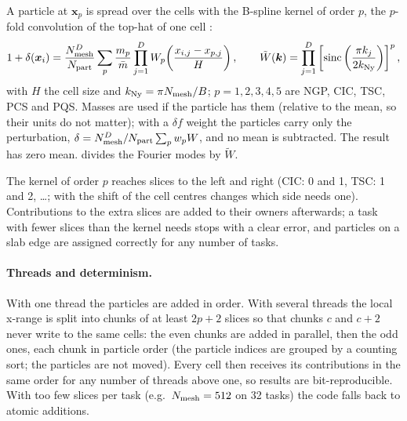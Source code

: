 A particle at $\bm x_p$ is spread over the cells with the B-spline kernel of order $p$, the $p$-fold convolution of the top-hat
of one cell \cite{HockneyEastwood1988}:
\begin{equation}
1+\delta(\bm x_i)=\frac{N_{\rm mesh}^D}{N_{\rm part}}\sum_p\frac{m_p}{\bar m}\prod_{j=1}^DW_p\!\left(\frac{x_{i,j}-x_{p,j}}{H}\right),\qquad
\tilde W(\bm k)=\prod_{j=1}^D\left[\mathrm{sinc}\left(\frac{\pi k_j}{2k_{\rm Ny}}\right)\right]^p,
\end{equation}
with $H$ the cell size and $k_{\rm Ny}=\pi N_{\rm mesh}/B$; $p=1,2,3,4,5$ are NGP, CIC, TSC, PCS and PQS. Masses are used if the
particle has them (relative to the mean, so their units do not matter); with a $\delta f$ weight the particles carry only the
perturbation, $\delta=N_{\rm mesh}^D/N_{\rm part}\sum_pw_pW$, and no mean is subtracted. The result has zero mean.
 divides the Fourier modes by $\tilde W$.

The kernel of order $p$ reaches  slices to the left and right (CIC: 0 and 1, TSC: 1 and 2, \ldots;
with  the shift of the cell centres changes which side needs one). Contributions to the extra slices are
added to their owners afterwards; a task with fewer slices than the kernel needs stops with a clear error, and particles on a slab
edge are assigned correctly for any number of tasks.

\paragraph*{Threads and determinism.} With one thread the particles are added in order. With several threads the local x-range is
split into chunks of at least $2p+2$ slices so that chunks $c$ and $c+2$ never write to the same cells: the even chunks are added in
parallel, then the odd ones, each chunk in particle order (the particle indices are grouped by a counting sort; the particles are not
moved). Every cell then receives its contributions in the same order for any number of threads above one, so results are
bit-reproducible. With too few slices per task (e.g.\ $N_{\rm mesh}=512$ on 32 tasks) the code falls back to atomic additions.

